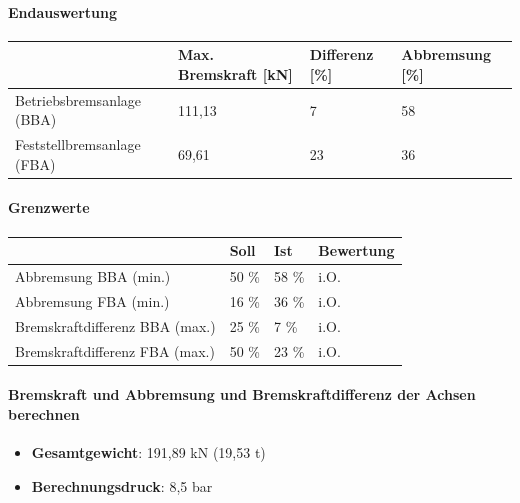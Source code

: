 \documentclass{vorlage-design-main}
\begin{document}
\paragraph{Endauswertung}\label{endauswertung}

\begin{table}[ht]
  \begin{tabular}{@{}llll@{}}
\toprule
& 
Max. Bremskraft {[}kN{]}
 & 
Differenz {[}\%{]}
 & 
Abbremsung {[}\%{]}
 \\
\midrule[\heavyrulewidth]
Betriebsbremsanlage (BBA) & 111,13 & 7 & 58 \\
Feststellbremsanlage (FBA) & 69,61 & 23 & 36 \\
\bottomrule
\end{tabular}%
\end{table}

\paragraph{Grenzwerte}\label{grenzwerte}

\begin{table}[ht]
  \begin{tabular}{@{}llll@{}}
  \toprule

& Soll & Ist & Bewertung \\
\midrule[\heavyrulewidth]
Abbremsung BBA (min.) & 50 \% & 58 \% & i.O. \\
Abbremsung FBA (min.) & 16 \% & 36 \% & i.O. \\
Bremskraftdifferenz BBA (max.) & 25 \% & 7 \% & i.O. \\
Bremskraftdifferenz FBA (max.) & 50 \% & 23 \% & i.O. \\
  \bottomrule
  \end{tabular}%
\end{table}

\paragraph{Bremskraft und Abbremsung und Bremskraftdifferenz der Achsen
berechnen}\label{bremskraft-und-abbremsung-und-bremskraftdifferenz-der-achsen-berechnen}

\begin{itemize}

\item
  \textbf{Gesamtgewicht}: 191,89 kN (19,53 t)
\item
  \textbf{Berechnungsdruck}: 8,5 bar
\end{itemize}
\end{document}
